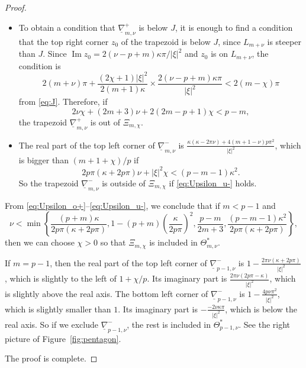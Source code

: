 \documentclass[a4paper,dvipdfmx]{amsart}
\theoremstyle{plain}
\theoremstyle{definition}
\theoremstyle{remark}
\renewcommand{\Im}{\operatorname{Im}}
\numberwithin{equation}{section}
\begin{document}
\begin{proof}
\begin{itemize}
\begin{equation*}
  \frac{2(p+m+1-\nu)\kappa\pi}{|\xi|^2}
  -
  \frac{(p+m)\kappa}{2p^2\pi}
  =
  \frac{\kappa\bigl(4p^2(1-\nu)\pi^2-(p+m)\kappa^2\bigr)}{2p^2\pi|\xi|^2},
\end{equation*}
which is positive if
\begin{equation}\label{eq:Upsilon_o-}
  \nu<1-(p+m)\left(\frac{\kappa}{2p\pi}\right)^2.
\end{equation}
So, we conclude that $\overline{\nabla}^{-}_{m,\nu}$ is outside of $\Xi_{m,\chi}$ if \eqref{eq:Upsilon_o-} holds.
\item
To obtain a condition that $\underline{\nabla}^{+}_{m,\nu}$ is below $J$, it is enough to find a condition that the top right corner $z_0$ of the trapezoid is below $J$, since $L_{m+\nu}$ is steeper than $J$.
Since $\Im{z_0}=2(\nu-p+m)\kappa\pi/|\xi|^2$ and $z_0$ is on $L_{m+\nu}$, the condition is
\begin{equation*}
  2(m+\nu)\pi+\frac{(2\chi+1)|\xi|^2}{2(m+1)\kappa}\times\frac{2(\nu-p+m)\kappa\pi}{|\xi|^2}
  <
  2(m-\chi)\pi
\end{equation*}
from \eqref{eq:J}.
Therefore, if
\begin{equation}\label{eq:Upsilon_u+}
  2\nu\chi+(2m+3)\nu+2(2m-p+1)\chi<p-m,
\end{equation}
the trapezoid $\underline{\nabla}^{+}_{m,\nu}$ is out of $\Xi_{m,\chi}$.
\item
The real part of the top left corner of $\underline{\nabla}^{-}_{m,\nu}$ is $\frac{\kappa(\kappa-2\pi\nu)+4(m+1-\nu)p\pi^2}{|\xi|^2}$, which is bigger than $(m+1+\chi)/p$
if
\begin{equation}\label{eq:Upsilon_u-}
  2p\pi(\kappa+2p\pi)\nu+|\xi|^2\chi<(p-m-1)\kappa^2.
\end{equation}
So the trapezoid $\underline{\nabla}^{-}_{m,\nu}$ is outside of $\Xi_{m,\chi}$ if \eqref{eq:Upsilon_u-} holds.
\end{itemize}
From \eqref{eq:Upsilon_o+}--\eqref{eq:Upsilon_u-}, we conclude that if $m<p-1$ and
\begin{equation*}
  \nu<
  \min
  \left\{
    \frac{(p+m)\kappa}{2p\pi(\kappa+2p\pi)},
    1-(p+m)\left(\frac{\kappa}{2p\pi}\right)^2,
    \frac{p-m}{2m+3},
    \frac{(p-m-1)\kappa^2}{2p\pi(\kappa+2p\pi)}
  \right\},
\end{equation*}
then we can choose $\chi>0$ so that $\Xi_{m,\chi}$ is included in $\Theta^{\ast}_{m,\nu}$.
\par
If $m=p-1$, then the real part of the top left corner of $\underline{\nabla}^{-}_{p-1,\nu}$ is $1-\frac{2\pi\nu(\kappa+2p\pi)}{|\xi|^2}$, which is slightly to the left of $1+\chi/p$.
Its imaginary part is $\frac{2\pi\nu(2p\pi-\kappa)}{|\xi|^2}$, which is slightly above the real axis.
The bottom left corner of $\underline{\nabla}^{-}_{p-1,\nu}$ is $1-\frac{4p\nu\pi^2}{|\xi|^2}$, which is slightly smaller than $1$.
Its imaginary part is $-\frac{-2\nu\kappa\pi}{|\xi|^2}$, which is below the real axis.
So if we exclude $\underline{\nabla}^{-}_{p-1,\nu}$, the rest is included in $\Theta^{\ast}_{p-1,\nu}$.
See the right picture of Figure~\ref{fig:pentagon}.
\par
The proof is complete.
\end{proof}
\end{document}
